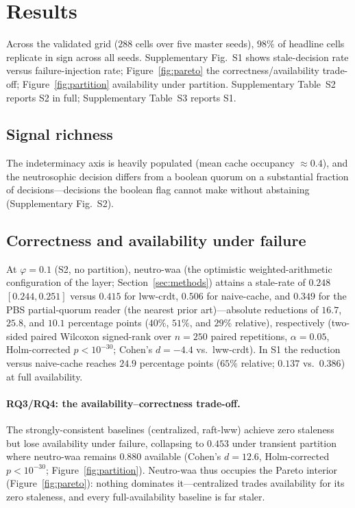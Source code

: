 \documentclass[fleqn,10pt]{wlscirep}
\begin{document}
\section{Results}
\label{sec:results}

Across the validated grid ($288$ cells over five master seeds), $98\%$ of headline cells replicate
in sign across all seeds.
Supplementary Fig.~S1 shows stale-decision rate versus failure-injection rate; Figure~\ref{fig:pareto}
the correctness/availability trade-off; Figure~\ref{fig:partition} availability under partition.
Supplementary Table~S2 reports S2 in full; Supplementary Table~S3 reports S1.

\subsection{Signal richness}
The indeterminacy axis is heavily populated (mean cache occupancy
$\approx 0.4$), and the neutrosophic decision differs from a boolean quorum on a substantial fraction
of decisions---decisions the boolean flag cannot make without abstaining (Supplementary Fig.~S2).

\subsection{Correctness and availability under failure}
At $\varphi=0.1$ (S2, no partition),
neutro-waa (the optimistic weighted-arithmetic configuration of the layer; Section~\ref{sec:methods})
attains a stale-rate of $0.248$ $[0.244,0.251]$ versus $0.415$ for lww-crdt, $0.506$ for
naive-cache, and $0.349$ for the PBS partial-quorum reader (the nearest prior art)---absolute reductions of
$16.7$, $25.8$, and $10.1$ percentage points ($40\%$, $51\%$, and $29\%$ relative), respectively
(two-sided paired Wilcoxon signed-rank over $n=250$ paired repetitions, $\alpha=0.05$, Holm-corrected
$p<10^{-30}$; Cohen's $d=-4.4$ vs.\ lww-crdt). In S1 the reduction versus naive-cache reaches $24.9$
percentage points ($65\%$ relative; $0.137$ vs.\ $0.386$)
at full availability.

\paragraph{RQ3/RQ4: the availability--correctness trade-off.} The strongly-consistent baselines
(centralized, raft-lww) achieve zero staleness but lose availability under failure, collapsing to
$0.453$ under transient partition where neutro-waa remains $0.880$ available
(Cohen's $d=12.6$, Holm-corrected $p<10^{-30}$; Figure~\ref{fig:partition}). Neutro-waa thus occupies the
Pareto interior (Figure~\ref{fig:pareto}): nothing dominates it---centralized trades availability for
its zero staleness, and every full-availability baseline is far staler.
\end{document}
